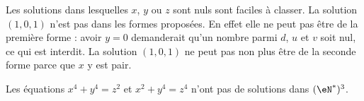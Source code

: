 \begin{remark}
    Les solutions dans lesquelles \( x\), \( y\) ou \( z\) sont nuls sont faciles à classer. La solution \( (1,0,1)\) n'est pas dans les formes proposées. En effet elle ne peut pas être de la première forme : avoir \( y=0\) demanderait qu'un nombre parmi \( d\), \( u\) et \( v\) soit nul, ce qui est interdit. La solution \( (1,0,1) \) ne peut pas non plus être de la seconde forme parce que \( x\) y est pair.
\end{remark}

\begin{proposition}      \label{propFKKKooFYQcxE}
    Les équations \( x^4+y^4=z^2\) et \( x^2+y^4=z^4\) n'ont pas de solutions dans \( (\eN^*)^3\).
\end{proposition}

